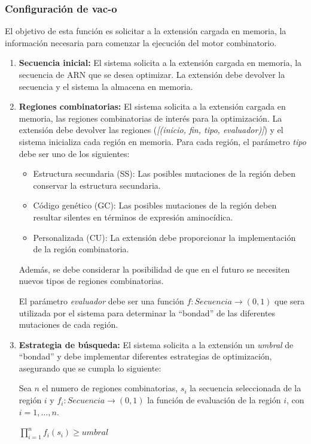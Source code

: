 \documentclass[10pt,a4paper]{article}
\begin{document}
  \subsubsection{Configuraci\'on de vac-o}
  El objetivo de esta funci\'on es solicitar a la extensi\'on cargada en memoria, la informaci\'on necesaria para comenzar la ejecuci\'on del motor combinatorio.
  \begin{enumerate}
    \item \textbf{Secuencia inicial:}
    El sistema solicita a la extensi\'on cargada en memoria, la secuencia de ARN que se desea optimizar. La extensi\'on debe devolver la secuencia y el sistema la almacena en memoria. 
    
    \item \textbf{Regiones combinatorias:}
    El sistema solicita a la extensi\'on cargada en memoria, las regiones combinatorias de inter\'es para la optimizaci\'on. La extensi\'on debe devolver las regiones (\textit{[(inicio, fin, tipo, evaluador)]}) y el sistema inicializa cada regi\'on en memoria. Para cada regi\'on, el par\'ametro \textit{tipo} debe ser uno de los siguientes:
    \begin{itemize}
      \item Estructura secundaria (SS): Las posibles mutaciones de la regi\'on deben conservar la estructura secundaria.
      \item C\'odigo gen\'etico (GC): Las posibles mutaciones de la regi\'on deben resultar silentes en t\'erminos de expresi\'on aminoc\'idica.
      \item Personalizada (CU): La extensi\'on debe proporcionar la implementaci\'on de la regi\'on combinatoria.
    \end{itemize}

    Adem\'as, se debe considerar la posibilidad de que en el futuro se necesiten nuevos tipos de regiones combinatorias.

    El par\'ametro \textit{evaluador} debe ser una funci\'on $f: Secuencia \rightarrow (0,1)$ que sera utilizada por el sistema para determinar la ``bondad'' de las diferentes mutaciones de cada regi\'on.

    \item \textbf{Estrategia de b\'usqueda:}
    El sistema solicita a la extensi\'on un \textit{umbral} de ``bondad'' y debe implementar diferentes estrategias de optimizaci\'on, asegurando que se cumpla lo siguiente:

    Sea $n$ el numero de regiones combinatorias, $s_{i}$ la secuencia seleccionada de la regi\'on $i$ y $f_{i}: Secuencia \rightarrow (0,1)$ la funci\'on de evaluaci\'on de la regi\'on $i$, con $i=1, ..., n$.
    \begin{center}
    $\prod_{i=1}^{n} f_{i}(s_{i}) \ge umbral$
    \end{center}


\end{enumerate}
\end{document}
